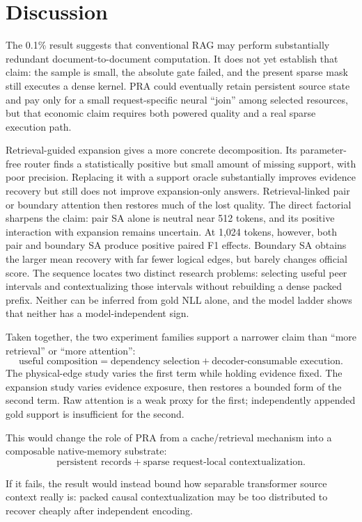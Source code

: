 \documentclass[11pt]{article}
\begin{document}
\section{Discussion}

The 0.1\% result suggests that conventional RAG may perform substantially
redundant document-to-document computation. It does not yet establish that
claim: the sample is small, the absolute gate failed, and the present sparse
mask still executes a dense kernel. PRA could eventually retain persistent
source state and pay only for a small request-specific neural ``join'' among
selected resources, but that economic claim requires both powered quality and
a real sparse execution path.

Retrieval-guided expansion gives a more concrete decomposition. Its
parameter-free router finds a statistically positive but small amount of
missing support, with poor precision. Replacing it with a support oracle
substantially improves evidence recovery but still does not improve
expansion-only answers. Retrieval-linked pair or boundary attention then
restores much of the lost quality. The direct factorial sharpens the claim:
pair SA alone is neutral near 512 tokens, and its positive interaction with
expansion remains uncertain. At 1,024 tokens, however, both pair and boundary
SA produce positive paired F1 effects. Boundary SA obtains the larger mean
recovery with far fewer logical edges, but barely changes official score. The
sequence locates two distinct research problems: selecting useful peer
intervals and contextualizing those intervals without rebuilding a dense
packed prefix. Neither can be inferred from gold NLL alone, and the model
ladder shows that neither has a model-independent sign.

Taken together, the two experiment families support a narrower claim than
``more retrieval'' or ``more attention'':
\[
\boxed{
\text{useful composition}
=
\text{dependency selection}
+
\text{decoder-consumable execution}.
}
\]
The physical-edge study varies the first term while holding evidence fixed.
The expansion study varies evidence exposure, then restores a bounded form of
the second term. Raw attention is a weak proxy for the first; independently
appended gold support is insufficient for the second.

This would change the role of PRA from a cache/retrieval mechanism into a
composable native-memory substrate:
\[
\text{persistent records}
+
\text{sparse request-local contextualization}.
\]

If it fails, the result would instead bound how separable transformer source
context really is: packed causal contextualization may be too distributed to
recover cheaply after independent encoding.
\end{document}
